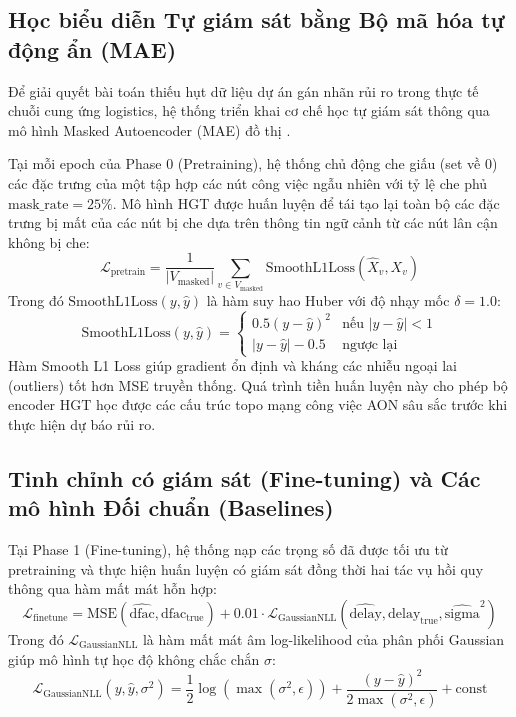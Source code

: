 \subsection{Học biểu diễn Tự giám sát bằng Bộ mã hóa tự động ẩn (MAE)}
Để giải quyết bài toán thiếu hụt dữ liệu dự án gán nhãn rủi ro trong thực tế chuỗi cung ứng logistics, hệ thống triển khai cơ chế học tự giám sát thông qua mô hình Masked Autoencoder (MAE) đồ thị \cite{he2022mae}.

Tại mỗi epoch của Phase 0 (Pretraining), hệ thống chủ động che giấu (set về 0) các đặc trưng của một tập hợp các nút công việc ngẫu nhiên với tỷ lệ che phủ $\text{mask\_rate} = 25\%$. Mô hình HGT được huấn luyện để tái tạo lại toàn bộ các đặc trưng bị mất của các nút bị che dựa trên thông tin ngữ cảnh từ các nút lân cận không bị che:
\begin{equation}
    \mathcal{L}_{\text{pretrain}} = \frac{1}{|V_{\text{masked}}|} \sum_{v \in V_{\text{masked}}} \text{SmoothL1Loss}\left( \widehat{X}_v, X_v \right)
\end{equation}
Trong đó $\text{SmoothL1Loss}(y, \hat{y})$ là hàm suy hao Huber với độ nhạy mốc $\delta = 1.0$:
\begin{equation}
    \text{SmoothL1Loss}(y, \hat{y}) = \begin{cases} 
      0.5 (y - \hat{y})^2 & \text{nếu } |y - \hat{y}| < 1 \\
      |y - \hat{y}| - 0.5 & \text{ngược lại}
   \end{cases}
\end{equation}
Hàm Smooth L1 Loss giúp gradient ổn định và kháng các nhiễu ngoại lai (outliers) tốt hơn MSE truyền thống. Quá trình tiền huấn luyện này cho phép bộ encoder HGT học được các cấu trúc topo mạng công việc AON sâu sắc trước khi thực hiện dự báo rủi ro.

\subsection{Tinh chỉnh có giám sát (Fine-tuning) và Các mô hình Đối chuẩn (Baselines)}
Tại Phase 1 (Fine-tuning), hệ thống nạp các trọng số đã được tối ưu từ pretraining và thực hiện huấn luyện có giám sát đồng thời hai tác vụ hồi quy thông qua hàm mất mát hỗn hợp:
\begin{equation}
    \mathcal{L}_{\text{finetune}} = \text{MSE}\left( \widehat{\text{dfac}}, \text{dfac}_{\text{true}} \right) + 0.01 \cdot \mathcal{L}_{\text{GaussianNLL}} \left( \widehat{\text{delay}}, \text{delay}_{\text{true}}, \widehat{\text{sigma}}^2 \right)
\end{equation}
Trong đó $\mathcal{L}_{\text{GaussianNLL}}$ là hàm mất mát âm log-likelihood của phân phối Gaussian giúp mô hình tự học độ không chắc chắn $\sigma$:
\begin{equation}
    \mathcal{L}_{\text{GaussianNLL}}(y, \hat{y}, \sigma^2) = \frac{1}{2} \log\left(\max(\sigma^2, \epsilon)\right) + \frac{(y - \hat{y})^2}{2 \max(\sigma^2, \epsilon)} + \text{const}
\end{equation}

